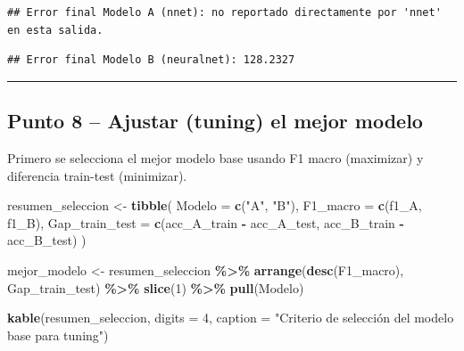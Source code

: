 \documentclass[
]{article}
\newenvironment{Shaded}{\begin{snugshade}}{\end{snugshade}}
\newcommand{\AttributeTok}[1]{\textcolor[rgb]{0.13,0.29,0.53}{#1}}
\newcommand{\DecValTok}[1]{\textcolor[rgb]{0.00,0.00,0.81}{#1}}
\newcommand{\FunctionTok}[1]{\textcolor[rgb]{0.13,0.29,0.53}{\textbf{#1}}}
\newcommand{\NormalTok}[1]{#1}
\newcommand{\OtherTok}[1]{\textcolor[rgb]{0.56,0.35,0.01}{#1}}
\newcommand{\SpecialCharTok}[1]{\textcolor[rgb]{0.81,0.36,0.00}{\textbf{#1}}}
\newcommand{\StringTok}[1]{\textcolor[rgb]{0.31,0.60,0.02}{#1}}
\begin{document}
\begin{verbatim}
## Error final Modelo A (nnet): no reportado directamente por 'nnet' en esta salida.
\end{verbatim}

\begin{Shaded}
\end{Shaded}

\begin{verbatim}
## Error final Modelo B (neuralnet): 128.2327
\end{verbatim}

\begin{center}\rule{0.5\linewidth}{0.5pt}\end{center}

\hypertarget{punto-8-ajustar-tuning-el-mejor-modelo}{%
\subsection{Punto 8 -- Ajustar (tuning) el mejor
modelo}\label{punto-8-ajustar-tuning-el-mejor-modelo}}

Primero se selecciona el mejor modelo base usando F1 macro (maximizar) y
diferencia train-test (minimizar).

\begin{Shaded}
\begin{Highlighting}[]
\NormalTok{resumen\_seleccion }\OtherTok{\textless{}{-}} \FunctionTok{tibble}\NormalTok{(}
  \AttributeTok{Modelo =} \FunctionTok{c}\NormalTok{(}\StringTok{"A"}\NormalTok{, }\StringTok{"B"}\NormalTok{),}
  \AttributeTok{F1\_macro =} \FunctionTok{c}\NormalTok{(f1\_A, f1\_B),}
  \AttributeTok{Gap\_train\_test =} \FunctionTok{c}\NormalTok{(acc\_A\_train }\SpecialCharTok{{-}}\NormalTok{ acc\_A\_test, acc\_B\_train }\SpecialCharTok{{-}}\NormalTok{ acc\_B\_test)}
\NormalTok{)}

\NormalTok{mejor\_modelo }\OtherTok{\textless{}{-}}\NormalTok{ resumen\_seleccion }\SpecialCharTok{\%\textgreater{}\%}
  \FunctionTok{arrange}\NormalTok{(}\FunctionTok{desc}\NormalTok{(F1\_macro), Gap\_train\_test) }\SpecialCharTok{\%\textgreater{}\%}
  \FunctionTok{slice}\NormalTok{(}\DecValTok{1}\NormalTok{) }\SpecialCharTok{\%\textgreater{}\%}
  \FunctionTok{pull}\NormalTok{(Modelo)}

\FunctionTok{kable}\NormalTok{(resumen\_seleccion, }\AttributeTok{digits =} \DecValTok{4}\NormalTok{,}
      \AttributeTok{caption =} \StringTok{"Criterio de selección del modelo base para tuning"}\NormalTok{)}
\end{Highlighting}
\end{Shaded}
\end{document}

